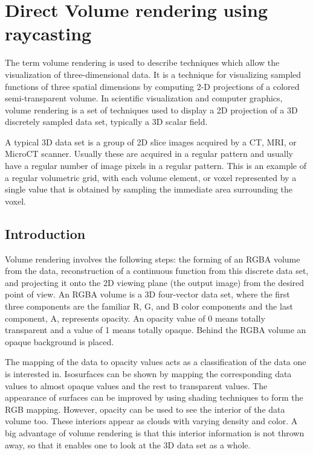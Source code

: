 

\chapter{Direct Volume rendering using raycasting}\label{chap:errors}

The term volume rendering is used to describe techniques which allow the visualization of three-dimensional data. It is a technique for visualizing sampled functions of three spatial dimensions by computing 2-D projections of a colored semi-transparent volume. In scientific visualization and computer graphics, volume rendering is a set of techniques used to display a 2D projection of a 3D discretely sampled data set, typically a 3D scalar field.

A typical 3D data set is a group of 2D slice images acquired by a CT, MRI, or MicroCT scanner. Usually these are acquired in a regular pattern and usually have a regular number of image pixels in a regular pattern. This is an example of a regular volumetric grid, with each volume element, or voxel represented by a single value that is obtained by sampling the immediate area surrounding the voxel.

\section{Introduction}

Volume rendering involves the following steps: the forming of an RGBA volume from the data, reconstruction of a continuous function from this discrete data set, and projecting it onto the 2D viewing plane (the output image) from the desired point of view. An RGBA volume is a 3D four-vector data set, where the first three components are the familiar R, G, and B color components and the last component, A, represents opacity. An opacity value of 0 means totally transparent and a value of 1 means totally opaque. Behind the RGBA volume an opaque background is placed.

The mapping of the data to opacity values acts as a classification of the data one is interested in. Isosurfaces can be shown by mapping the corresponding data values to almost opaque values and the rest to transparent values. The appearance of surfaces can be improved by using shading techniques to form the RGB mapping. However, opacity can be used to see the interior of the data volume too. These interiors appear as clouds with varying density and color. A big advantage of volume rendering is that this interior information is not thrown away, so that it enables one to look at the 3D data set as a whole. 

